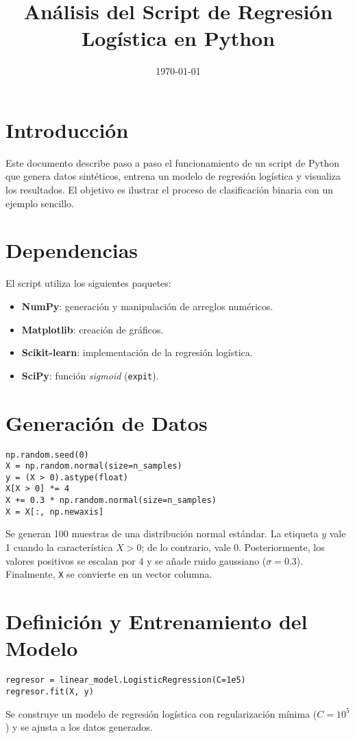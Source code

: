 \documentclass[11pt]{article}
\title{Análisis del Script de Regresión Logística en Python}
\author{}
\date{\today}
\begin{document}
\maketitle

\section{Introducción}
Este documento describe paso a paso el funcionamiento de un script de Python que genera datos sintéticos, entrena un modelo de regresión logística y visualiza los resultados. El objetivo es ilustrar el proceso de clasificación binaria con un ejemplo sencillo.

\section{Dependencias}
El script utiliza los siguientes paquetes:
\begin{itemize}
  \item \textbf{NumPy}: generación y manipulación de arreglos numéricos.
  \item \textbf{Matplotlib}: creación de gráficos.
  \item \textbf{Scikit\nobreakdash-learn}: implementación de la regresión logística.
  \item \textbf{SciPy}: función \textit{sigmoid} (\texttt{expit}).
\end{itemize}

\section{Generación de Datos}
\begin{verbatim}
np.random.seed(0)
X = np.random.normal(size=n_samples)
y = (X > 0).astype(float)
X[X > 0] *= 4
X += 0.3 * np.random.normal(size=n_samples)
X = X[:, np.newaxis]
\end{verbatim}
Se generan 100 muestras de una distribución normal estándar. La etiqueta $y$ vale 1 cuando la característica $X > 0$; de lo contrario, vale 0. Posteriormente, los valores positivos se escalan por 4 y se añade ruido gaussiano ($\sigma = 0.3$). Finalmente, \texttt{X} se convierte en un vector columna.

\section{Definición y Entrenamiento del Modelo}
\begin{verbatim}
regresor = linear_model.LogisticRegression(C=1e5)
regresor.fit(X, y)
\end{verbatim}
Se construye un modelo de regresión logística con regularización mínima ($C = 10^{5}$) y se ajusta a los datos generados.
\end{document}
